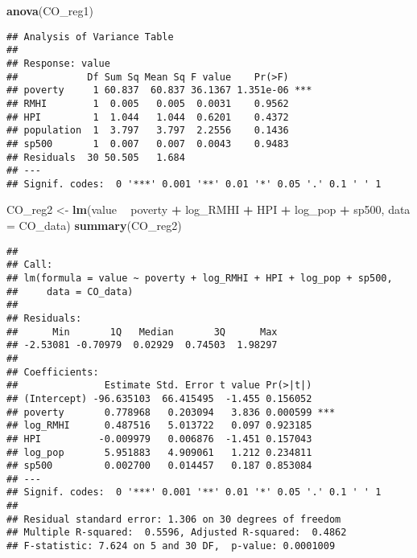\documentclass[
]{article}
\newenvironment{Shaded}{\begin{snugshade}}{\end{snugshade}}
\newcommand{\DataTypeTok}[1]{\textcolor[rgb]{0.13,0.29,0.53}{#1}}
\newcommand{\KeywordTok}[1]{\textcolor[rgb]{0.13,0.29,0.53}{\textbf{#1}}}
\newcommand{\NormalTok}[1]{#1}
\newcommand{\OperatorTok}[1]{\textcolor[rgb]{0.81,0.36,0.00}{\textbf{#1}}}
\newcommand{\StringTok}[1]{\textcolor[rgb]{0.31,0.60,0.02}{#1}}
\begin{document}
\begin{Shaded}
\begin{Highlighting}[]
\KeywordTok{anova}\NormalTok{(CO_reg1)}
\end{Highlighting}
\end{Shaded}

\begin{verbatim}
## Analysis of Variance Table
## 
## Response: value
##            Df Sum Sq Mean Sq F value    Pr(>F)    
## poverty     1 60.837  60.837 36.1367 1.351e-06 ***
## RMHI        1  0.005   0.005  0.0031    0.9562    
## HPI         1  1.044   1.044  0.6201    0.4372    
## population  1  3.797   3.797  2.2556    0.1436    
## sp500       1  0.007   0.007  0.0043    0.9483    
## Residuals  30 50.505   1.684                      
## ---
## Signif. codes:  0 '***' 0.001 '**' 0.01 '*' 0.05 '.' 0.1 ' ' 1
\end{verbatim}

\begin{Shaded}
\begin{Highlighting}[]
\NormalTok{CO_reg2 <-}\StringTok{ }\KeywordTok{lm}\NormalTok{(value }\OperatorTok{~}\StringTok{ }\NormalTok{poverty }\OperatorTok{+}\StringTok{ }\NormalTok{log_RMHI }\OperatorTok{+}\StringTok{ }\NormalTok{HPI }\OperatorTok{+}\StringTok{ }\NormalTok{log_pop }\OperatorTok{+}\StringTok{ }\NormalTok{sp500, }\DataTypeTok{data =}\NormalTok{ CO_data)}
\KeywordTok{summary}\NormalTok{(CO_reg2)}
\end{Highlighting}
\end{Shaded}

\begin{verbatim}
## 
## Call:
## lm(formula = value ~ poverty + log_RMHI + HPI + log_pop + sp500, 
##     data = CO_data)
## 
## Residuals:
##      Min       1Q   Median       3Q      Max 
## -2.53081 -0.70979  0.02929  0.74503  1.98297 
## 
## Coefficients:
##               Estimate Std. Error t value Pr(>|t|)    
## (Intercept) -96.635103  66.415495  -1.455 0.156052    
## poverty       0.778968   0.203094   3.836 0.000599 ***
## log_RMHI      0.487516   5.013722   0.097 0.923185    
## HPI          -0.009979   0.006876  -1.451 0.157043    
## log_pop       5.951883   4.909061   1.212 0.234811    
## sp500         0.002700   0.014457   0.187 0.853084    
## ---
## Signif. codes:  0 '***' 0.001 '**' 0.01 '*' 0.05 '.' 0.1 ' ' 1
## 
## Residual standard error: 1.306 on 30 degrees of freedom
## Multiple R-squared:  0.5596, Adjusted R-squared:  0.4862 
## F-statistic: 7.624 on 5 and 30 DF,  p-value: 0.0001009
\end{verbatim}
\end{document}
